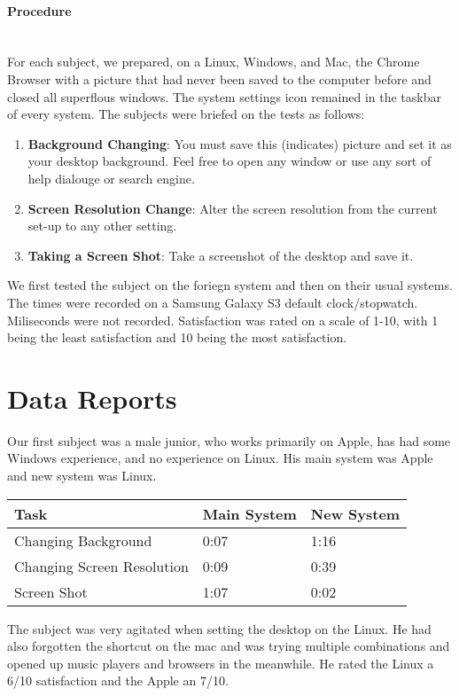 \documentclass[12pt, onesided, letterpaper]{report}
\begin{document}
\paragraph*{Procedure} ~\\
For each subject, we prepared, on a Linux, Windows, and Mac, the Chrome Browser with a picture that had never been saved to the computer before and closed all superflous windows. The system settings icon remained in the taskbar of every system.  The subjects were briefed on the tests as follows:
\begin{enumerate}
\item \textbf{Background Changing}: You must save this (indicates) picture and set it as your desktop background.  Feel free to open any window or use any sort of help dialouge or search engine.
\item \textbf{Screen Resolution Change}: Alter the screen resolution from the current set-up to any other setting.
\item \textbf{Taking a Screen Shot}: Take a screenshot of the desktop and save it.
\end{enumerate}
We first tested the subject on the foriegn system and then on their usual systems. The times were recorded on a Samsung Galaxy S3 default clock/stopwatch.  Miliseconds were not recorded.  Satisfaction was rated on a scale of 1-10, with 1 being the least satisfaction and 10 being the most satisfaction.
\pagebreak

\section*{Data Reports}
Our first subject was a male junior, who works primarily on Apple, has had some Windows experience, and no experience on Linux. His main system was Apple and new system was Linux.
\begin{center}
    \begin{tabular}{ | l | l | l |}
    \hline
    Task &Main System & New System  \\ \hline
    Changing Background & 0:07 & 1:16  \\ \hline
    Changing Screen Resolution & 0:09 & 0:39  \\ \hline
    Screen Shot & 1:07 & 0:02 \\
    \hline
    \end{tabular}
\end{center}
The subject was very agitated when setting the desktop on the Linux.  He had also forgotten the shortcut on the mac and was trying multiple combinations and opened up music players and browsers in the meanwhile. 
He rated the Linux a 6/10 satisfaction and the Apple an 7/10.
\end{document}
